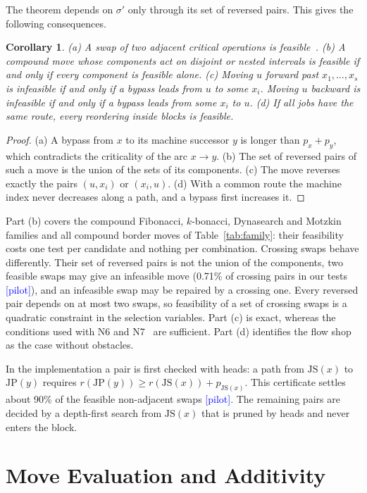 \documentclass[10pt,twocolumn]{article}
\newtheorem{corollary}{Corollary}
\newcommand{\pilot}{\textcolor{blue}{[pilot]}}
\newcommand{\JP}{\mathrm{JP}}
\newcommand{\JS}{\mathrm{JS}}
\begin{document}
The theorem depends on $\sigma'$ only through its set of reversed pairs.
This gives the following consequences.

\begin{corollary}\label{co:all}
(a) A swap of two adjacent critical operations is
feasible~\cite{laarhoven1992}.
(b) A compound move whose components act on disjoint or nested intervals
is feasible if and only if every component is feasible alone.
(c) Moving $u$ forward past $x_1,\dots,x_s$ is infeasible if and only if
a bypass leads from $u$ to some $x_i$. Moving $u$ backward is infeasible
if and only if a bypass leads from some $x_i$ to $u$.
(d) If all jobs have the same route, every reordering inside blocks is
feasible.
\end{corollary}
\begin{proof}
(a) A bypass from $x$ to its machine successor $y$ is longer than
$p_x+p_y$, which contradicts the criticality of the arc $x\to y$. (b) The
set of reversed pairs of such a move is the union of the sets of its
components. (c) The move reverses exactly the pairs $(u,x_i)$ or
$(x_i,u)$. (d) With a common route the machine index never decreases
along a path, and a bypass first increases it.
\end{proof}

Part (b) covers the compound Fibonacci, $k$-bonacci, Dynasearch and
Motzkin families and all compound border moves of
Table~\ref{tab:family}: their feasibility costs one test per candidate
and nothing per combination. Crossing swaps behave differently. Their set
of reversed pairs is not the union of the components, two feasible swaps
may give an infeasible move (0.71\% of crossing pairs in our tests
\pilot), and an infeasible swap may be repaired by a crossing one. Every
reversed pair depends on at most two swaps, so feasibility of a set of
crossing swaps is a quadratic constraint in the selection variables.
Part (c) is exact, whereas the conditions used with N6 and
N7~\cite{balas1998,zhang2007} are sufficient. Part (d) identifies the
flow shop as the case without obstacles.

In the implementation a pair is first checked with heads: a path from
$\JS(x)$ to $\JP(y)$ requires $r(\JP(y))\ge r(\JS(x))+p_{\JS(x)}$. This
certificate settles about 90\% of the feasible non-adjacent swaps
\pilot. The remaining pairs are decided by a depth-first search from
$\JS(x)$ that is pruned by heads and never enters the block.

\section{Move Evaluation and Additivity}\label{sec:eval}
\end{document}
